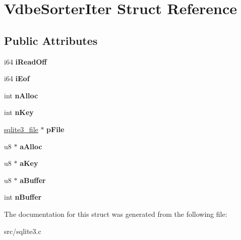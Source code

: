 \hypertarget{struct_vdbe_sorter_iter}{\section{Vdbe\-Sorter\-Iter Struct Reference}
\label{struct_vdbe_sorter_iter}
}
\subsection*{Public Attributes}
\begin{DoxyCompactItemize}
\item 
\hypertarget{struct_vdbe_sorter_iter_a3a02adf412dd2af1022d3d5f95aee180}{i64 {\bfseries i\-Read\-Off}}\label{struct_vdbe_sorter_iter_a3a02adf412dd2af1022d3d5f95aee180}

\item 
\hypertarget{struct_vdbe_sorter_iter_a017704dcc972c2d246414290e0a7ac81}{i64 {\bfseries i\-Eof}}\label{struct_vdbe_sorter_iter_a017704dcc972c2d246414290e0a7ac81}

\item 
\hypertarget{struct_vdbe_sorter_iter_a1e2eeb598b3709bca999e96e42163783}{int {\bfseries n\-Alloc}}\label{struct_vdbe_sorter_iter_a1e2eeb598b3709bca999e96e42163783}

\item 
\hypertarget{struct_vdbe_sorter_iter_a6c73b1e17f13a83fa99c21ab5fc4cf2b}{int {\bfseries n\-Key}}\label{struct_vdbe_sorter_iter_a6c73b1e17f13a83fa99c21ab5fc4cf2b}

\item 
\hypertarget{struct_vdbe_sorter_iter_ac6487cb536e6a3ba6209a5446b4ce0b0}{\hyperlink{structsqlite3__file}{sqlite3\-\_\-file} $\ast$ {\bfseries p\-File}}\label{struct_vdbe_sorter_iter_ac6487cb536e6a3ba6209a5446b4ce0b0}

\item 
\hypertarget{struct_vdbe_sorter_iter_a093de2f50db1cb5f84c6b9194dcc981b}{u8 $\ast$ {\bfseries a\-Alloc}}\label{struct_vdbe_sorter_iter_a093de2f50db1cb5f84c6b9194dcc981b}

\item 
\hypertarget{struct_vdbe_sorter_iter_ae3f5248ba23036136e11d3c6d067f485}{u8 $\ast$ {\bfseries a\-Key}}\label{struct_vdbe_sorter_iter_ae3f5248ba23036136e11d3c6d067f485}

\item 
\hypertarget{struct_vdbe_sorter_iter_a1be5dd1cf24f36af4ba56e3dc5f55e1f}{u8 $\ast$ {\bfseries a\-Buffer}}\label{struct_vdbe_sorter_iter_a1be5dd1cf24f36af4ba56e3dc5f55e1f}

\item 
\hypertarget{struct_vdbe_sorter_iter_a9c91dda70d7b50b7f661f2ed84462fc2}{int {\bfseries n\-Buffer}}\label{struct_vdbe_sorter_iter_a9c91dda70d7b50b7f661f2ed84462fc2}

\end{DoxyCompactItemize}


The documentation for this struct was generated from the following file\-:\begin{DoxyCompactItemize}
\item 
src/sqlite3.\-c\end{DoxyCompactItemize}
